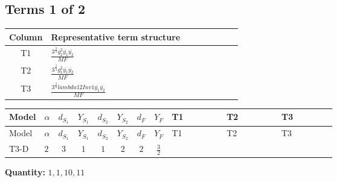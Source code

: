 \documentclass[8pt]{article}
\begin{document}
\begin{landscape}
\subsection*{Terms 1 of 2}
\begin{center}
\begin{tabular}{@{}c >{\raggedright\arraybackslash}p{0.82\linewidth}@{}}
\toprule
Column & Representative term structure \\
\midrule
T1 & \(\displaystyle \frac{3^{\frac{3}{4}} g_{2}^{2} \overline{y_{1}} \overline{y_{2}}}{MF}\) \\
\midrule
T2 & \(\displaystyle \frac{3^{\frac{3}{4}} g_{1}^{2} \overline{y_{1}} \overline{y_{2}}}{MF}\) \\
\midrule
T3 & \(\displaystyle \frac{3^{\frac{3}{4}} lambda12Inv1 \overline{y_{1}} \overline{y_{2}}}{MF}\) \\
\midrule
\bottomrule
\end{tabular}
\end{center}
\smallskip
\tiny
\begin{longtable}{@{}llcccccc >{\raggedright\arraybackslash}p{0.21\linewidth} >{\raggedright\arraybackslash}p{0.21\linewidth} >{\raggedright\arraybackslash}p{0.21\linewidth}@{}}
\toprule
Model & $\alpha$ & $d_{S_1}$ & $Y_{S_1}$ & $d_{S_2}$ & $Y_{S_2}$ & $d_F$ & $Y_F$ & T1 & T2 & T3 \\
\midrule
\endfirsthead
\toprule
Model & $\alpha$ & $d_{S_1}$ & $Y_{S_1}$ & $d_{S_2}$ & $Y_{S_2}$ & $d_F$ & $Y_F$ & T1 & T2 & T3 \\
\midrule
\endhead
T3-D & $2$ & $3$ & $1$ & $1$ & $2$ & $2$ & $\frac{3}{2}$ & \scriptsize\adjustbox{max width=\linewidth}{$\begin{gathered} - \frac{11 \cdot 3^{\frac{3}{4}} g_{2}^{2} \overline{y_{1}} \overline{y_{2}}}{8 MF}\end{gathered}$} & \scriptsize\adjustbox{max width=\linewidth}{$\begin{gathered} - \frac{9 \cdot 3^{\frac{3}{4}} g_{1}^{2} \overline{y_{1}} \overline{y_{2}}}{8 MF}\end{gathered}$} & \scriptsize\adjustbox{max width=\linewidth}{$\begin{gathered} - \frac{3^{\frac{3}{4}} lambda12Inv1 \overline{y_{1}} \overline{y_{2}}}{6 MF}\end{gathered}$} \\
\midrule
\bottomrule
\end{longtable}
\clearpage
\noindent\textbf{Quantity: }$\mathrm{1,1,10,11}$\par\smallskip

\end{landscape}
\end{document}
